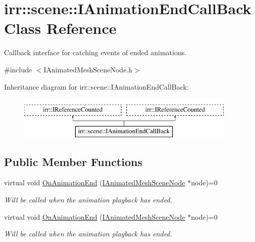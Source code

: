 \hypertarget{classirr_1_1scene_1_1IAnimationEndCallBack}{}\section{irr\+:\+:scene\+:\+:I\+Animation\+End\+Call\+Back Class Reference}
\label{classirr_1_1scene_1_1IAnimationEndCallBack}


Callback interface for catching events of ended animations.  




{\ttfamily \#include $<$I\+Animated\+Mesh\+Scene\+Node.\+h$>$}

Inheritance diagram for irr\+:\+:scene\+:\+:I\+Animation\+End\+Call\+Back\+:\begin{figure}[H]
\begin{center}
\leavevmode
\includegraphics[height=2.000000cm]{classirr_1_1scene_1_1IAnimationEndCallBack}
\end{center}
\end{figure}
\subsection*{Public Member Functions}
\begin{DoxyCompactItemize}
\item 
virtual void \hyperlink{classirr_1_1scene_1_1IAnimationEndCallBack_a7676b37828697b63e42ad5264274cc1f}{On\+Animation\+End} (\hyperlink{classirr_1_1scene_1_1IAnimatedMeshSceneNode}{I\+Animated\+Mesh\+Scene\+Node} $\ast$node)=0
\begin{DoxyCompactList}\small\item\em Will be called when the animation playback has ended. \end{DoxyCompactList}\item 
virtual void \hyperlink{classirr_1_1scene_1_1IAnimationEndCallBack_a7676b37828697b63e42ad5264274cc1f}{On\+Animation\+End} (\hyperlink{classirr_1_1scene_1_1IAnimatedMeshSceneNode}{I\+Animated\+Mesh\+Scene\+Node} $\ast$node)=0
\begin{DoxyCompactList}\small\item\em Will be called when the animation playback has ended. \end{DoxyCompactList}\end{DoxyCompactItemize}
